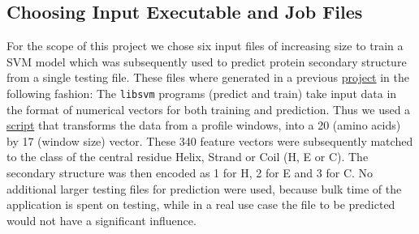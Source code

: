 \documentclass{article}
\begin{document}
\subsection{Choosing Input Executable and Job Files} %
For the scope of this project we chose six input files of increasing size to train a SVM model which was subsequently used to predict protein secondary structure from a single testing file.
These files where generated in a previous \href{https://github.com/ilante/LB-2-project-GOR-vs-SVM}{project} in the following fashion:
The \texttt{libsvm} programs (predict and train) take input data in the format of numerical vectors for both training and prediction. 
Thus we used a \href{https://github.com/ilante/LB-2-project-GOR-vs-SVM/blob/master/scripts/generate_svm_input.sh}{script} that transforms the data from a profile windows, into a 20 (amino acids) by 17 (window size) vector. These 340 feature vectors were subsequently matched to the class of the central residue Helix, Strand or Coil (H, E or C). 
The secondary structure was then encoded as 1 for H, 2 for E and 3 for C. 
No additional larger testing files for prediction were used, because bulk time of the application is spent on testing, while in a real use case the file to be predicted would not have a significant influence. %
\end{document}
